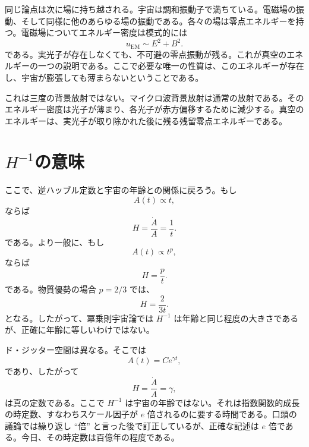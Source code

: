 同じ論点は次に場に持ち越される。宇宙は調和振動子で満ちている。電磁場の振動、そして同様に他のあらゆる場の振動である。各々の場は零点エネルギーを持つ。電磁場についてエネルギー密度は模式的には
\begin{equation}
u_{\mathrm{EM}}\sim E^2+B^2.
\end{equation}
である。実光子が存在しなくても、不可避の零点振動が残る。これが真空のエネルギーの一つの説明である。ここで必要な唯一の性質は、このエネルギーが存在し、宇宙が膨張しても薄まらないということである。

\begin{classroomqa}
\end{classroomqa}

これは三度の背景放射ではない。マイクロ波背景放射は通常の放射である。そのエネルギー密度は光子が薄まり、各光子が赤方偏移するために減少する。真空のエネルギーは、実光子が取り除かれた後に残る残留零点エネルギーである。

\section{\(H^{-1}\)の意味}

ここで、逆ハッブル定数と宇宙の年齢との関係に戻ろう。もし
\begin{equation}
A(t)\propto t,
\end{equation}
ならば
\begin{equation}
H=\frac{\dot A}{A}=\frac{1}{t}.
\end{equation}
である。より一般に、もし
\begin{equation}
A(t)\propto t^p,
\end{equation}
ならば
\begin{equation}
H=\frac{p}{t}.
\end{equation}
である。物質優勢の場合 \(p=2/3\) では、
\begin{equation}
H=\frac{2}{3t}.
\end{equation}
となる。したがって、冪乗則宇宙論では \(H^{-1}\) は年齢と同じ程度の大きさであるが、正確に年齢に等しいわけではない。

ド・ジッター空間は異なる。そこでは
\begin{equation}
A(t)=C e^{\gamma t},
\end{equation}
であり、したがって
\begin{equation}
H=\frac{\dot A}{A}=\gamma,
\end{equation}
は真の定数である。ここで \(H^{-1}\) は宇宙の年齢ではない。それは指数関数的成長の時定数、すなわちスケール因子が \(e\) 倍されるのに要する時間である。口頭の議論では繰り返し ``倍'' と言った後で訂正しているが、正確な記述は \(e\) 倍である。今日、その時定数は百億年の程度である。

